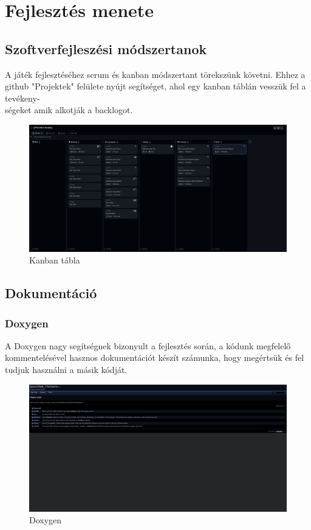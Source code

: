 \documentclass{scrarticle}
\begin{document}
\section{Fejlesztés menete}
\subsection{Szoftverfejleszési módszertanok}
A játék fejlesztéséhez scrum és kanban módszertant törekszünk követni. Ehhez a github "Projektek" felülete nyújt segítséget, ahol egy kanban táblán vesszük fel a tevékeny-\\ségeket amik alkotják a backlogot.
\begin{figure}[H]
    \includegraphics[width=1.0\columnwidth]{kanban_scrum.png}
    \caption{Kanban tábla}\label{fig:7}
\end{figure}
\subsection{Dokumentáció}
\subsubsection{Doxygen}
A Doxygen nagy segítségnek bizonyult a fejlesztés során, a kódunk megfelelő kommentelésével hasznos dokumentációt készít számunka, hogy megértsük és fel tudjuk használni a másik kódját.
\begin{figure}[H]
    \includegraphics[width=1.0\columnwidth]{doxygen_sample.png}
    \caption{Doxygen}\label{fig:8}
\end{figure}
\end{document}
